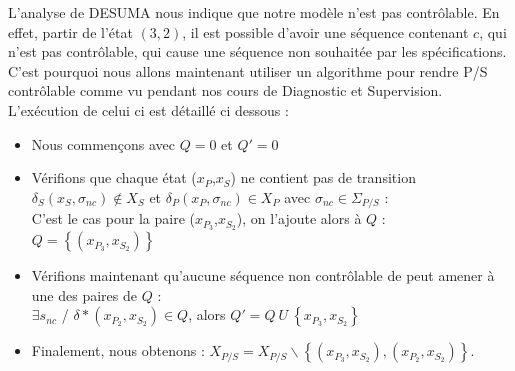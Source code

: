 L'analyse de DESUMA nous indique que notre modèle n'est pas contrôlable. En effet,  partir de l'état $(3,2)$, il est possible d'avoir une séquence contenant $c$, qui n'est pas contrôlable, qui cause une séquence non souhaitée par les spécifications. C'est pourquoi nous allons maintenant utiliser un algorithme pour rendre P/S contrôlable comme vu pendant nos cours de Diagnostic et Supervision. L'exécution de celui ci est détaillé ci dessous :
\begin{itemize}[label = \textbullet]
\item Nous commençons avec $Q = 0$ et $Q'=0$
\item Vérifions que chaque état ($x_P$,$x_S$) ne contient pas de transition $\delta_S(x_S,\sigma_{nc})\not\in X_S$ et $\delta_P(x_P,\sigma_{nc})\in X_P$ avec $\sigma_{nc}\in\Sigma_{P/S}$ : \\C'est le cas pour la paire ($x_{P_3}$,$x_{S_2}$), on l'ajoute alors à $Q$ : $Q = \left\lbrace (x_{P_3},x_{S_2}) \right\rbrace $
\item Vérifions maintenant qu'aucune séquence non contrôlable de peut amener à une des paires de $Q$ :\\
$\exists s_{nc}$ / $\delta*(x_{P_2},x_{S_2}) \in Q$, alors $Q' = Q\ U\ \left\lbrace x_{P_3},x_{S_2}\right\rbrace$
\item Finalement, nous obtenons : $X_{P/S} = X_{P/S} \backslash \left\lbrace (x_{P_3},x_{S_2}),(x_{P_2},x_{S_2}) \right\rbrace$.
\end{itemize}
\newpage
